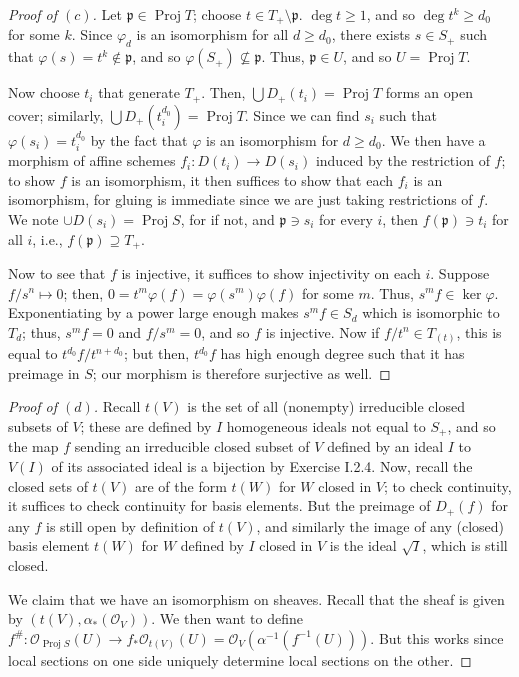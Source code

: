 \documentclass[12pt,letterpaper]{article}
\theoremstyle{definition}
\theoremstyle{remark}
\numberwithin{equation}{section}
\numberwithin{figure}{problem}
\DeclareMathOperator{\Proj}{Proj}
\newcommand{\OO}{\mathcal{O}}
\begin{document}
\begin{proof}[Proof of $(c)$]
  Let $\mathfrak{p} \in \Proj T$; choose $t \in T_+ \setminus \mathfrak{p}$. $\deg t \ge 1$, and so $\deg t^k \ge d_0$ for some $k$. Since $\varphi_d$ is an isomorphism for all $d \ge d_0$, there exists $s \in S_+$ such that $\varphi(s) = t^k \notin \mathfrak{p}$, and so $\varphi(S_+) \not\subseteq \mathfrak{p}$. Thus, $\mathfrak{p} \in U$, and so $U = \Proj T$.
  \par Now choose $t_i$ that generate $T_+$. Then, $\bigcup D_+(t_i) = \Proj T$ forms an open cover; similarly, $\bigcup D_+(t_i^{d_0}) = \Proj T$. Since we can find $s_i$ such that $\varphi(s_i) = t_i^{d_0}$ by the fact that $\varphi$ is an isomorphism for $d \ge d_0$. We then have a morphism of affine schemes $f_i\colon D(t_i) \to D(s_i)$ induced by the restriction of $f$; to show $f$ is an isomorphism, it then suffices to show that each $f_i$ is an isomorphism, for gluing is immediate since we are just taking restrictions of $f$. We note $\cup D(s_i) = \Proj S$, for if not, and $\mathfrak{p} \ni s_i$ for every $i$, then $f(\mathfrak{p}) \ni t_i$ for all $i$, i.e., $f(\mathfrak{p}) \supseteq T_+$.
  \par Now to see that $f$ is injective, it suffices to show injectivity on each $i$. Suppose $f/s^n \mapsto 0$; then, $0 = t^m\varphi(f) = \varphi(s^m)\varphi(f)$ for some $m$. Thus, $s^mf \in \ker\varphi$. Exponentiating by a power large enough makes $s^mf \in S_d$ which is isomorphic to $T_d$; thus, $s^mf = 0$ and $f/s^m = 0$, and so $f$ is injective. Now if $f/t^n \in T_{(t)}$, this is equal to $t^{d_0}f/t^{n+d_0}$; but then, $t^{d_0}f$ has high enough degree such that it has preimage in $S$; our morphism is therefore surjective as well.
\end{proof}
\begin{proof}[Proof of $(d)$]
  Recall $t(V)$ is the set of all (nonempty) irreducible closed subsets of $V$; these are defined by $I$ homogeneous ideals not equal to $S_+$, and so the map $f$ sending an irreducible closed subset of $V$ defined by an ideal $I$ to $V(I)$ of its associated ideal is a bijection by Exercise I.2.4. Now, recall the closed sets of $t(V)$ are of the form $t(W)$ for $W$ closed in $V$; to check continuity, it suffices to check continuity for basis elements. But the preimage of $D_+(f)$ for any $f$ is still open by definition of $t(V)$, and similarly the image of any (closed) basis element $t(W)$ for $W$ defined by $I$ closed in $V$ is the ideal $\sqrt{I}$, which is still closed.
  \par We claim that we have an isomorphism on sheaves. Recall that the sheaf is given by $(t(V),\alpha_*(\OO_V))$. We then want to define $f^\#\colon \OO_{\Proj S}(U) \to f_*\OO_{t(V)}(U) = \OO_{V}(\alpha^{-1}(f^{-1}(U)))$. But this works since local sections on one side uniquely determine local sections on the other.
\end{proof}
\end{document}
